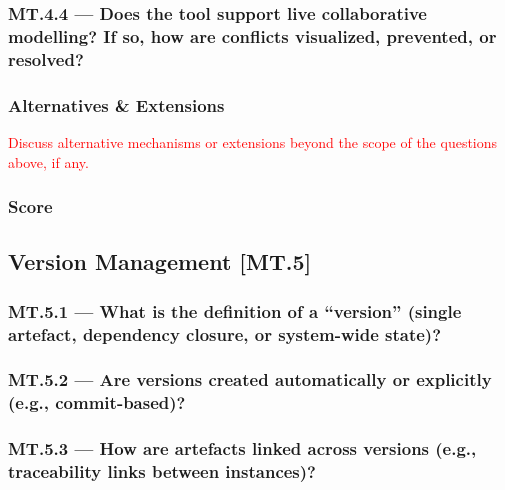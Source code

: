\documentclass[sigconf,review]{acmart}
\begin{document}
\subsubsection*{MT.4.4 --- Does the tool support live collaborative modelling? If so, how are conflicts visualized, prevented, or resolved?}
\label{sec:MT4-4}



\subsubsection*{Alternatives \& Extensions}
\label{sec:MT4-Alternatives-Extensions}

\textcolor{red}{Discuss alternative mechanisms or extensions beyond the 
scope of the questions above, if any.}

\subsubsection*{Score}
\label{sec:MT4-Score}



\subsection{Version Management [MT.5]}
\label{sec:MT5}

\subsubsection*{MT.5.1 --- What is the definition of a ``version'' (single artefact, dependency closure, or system-wide state)?}
\label{sec:MT5-1}



\subsubsection*{MT.5.2 --- Are versions created automatically or explicitly (e.g., commit-based)?}
\label{sec:MT5-2}



\subsubsection*{MT.5.3 --- How are artefacts linked across versions (e.g., traceability links between instances)?}
\label{sec:MT5-3}
\end{document}
